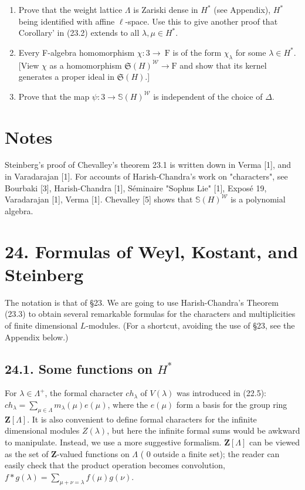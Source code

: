 \documentclass[10pt]{article}
\begin{document}
\begin{enumerate}
  \item Prove that the weight lattice $\Lambda$ is Zariski dense in $H^{*}$ (see Appendix), $H^{*}$ being identified with affine $\ell$-space. Use this to give another proof that Corollary' in (23.2) extends to all $\lambda, \mu \in H^{*}$.
  \item Every F-algebra homomorphism $\chi: 3 \rightarrow \mathrm{~F}$ is of the form $\chi_{\lambda}$ for some $\lambda \in H^{*}$. [View $\chi$ as a homomorphism $\mathfrak{S}(H)^{\mathscr{W}} \rightarrow \mathrm{F}$ and show that its kernel generates a proper ideal in $\mathfrak{S}(H)$.]
  \item Prove that the map $\psi: 3 \rightarrow \mathbb{S}(H)^{\mathscr{W}}$ is independent of the choice of $\Delta$.
\end{enumerate}

\section*{Notes}
Steinberg's proof of Chevalley's theorem 23.1 is written down in Verma [1], and in Varadarajan [1]. For accounts of Harish-Chandra's work on "characters", see Bourbaki [3], Harish-Chandra [1], Séminaire "Sophus Lie" [1], Exposé 19, Varadarajan [1], Verma [1]. Chevalley [5] shows that $\mathbb{S}(H)^{\mathscr{W}}$ is a polynomial algebra.

\section*{24. Formulas of Weyl, Kostant, and Steinberg}
The notation is that of §23. We are going to use Harish-Chandra's Theorem (23.3) to obtain several remarkable formulas for the characters and multiplicities of finite dimensional $L$-modules. (For a shortcut, avoiding the use of §23, see the Appendix below.)

\subsection*{24.1. Some functions on $H^{*}$}
For $\lambda \in \Lambda^{+}$, the formal character $c h_{\lambda}$ of $V(\lambda)$ was introduced in (22.5): $c h_{\lambda}=\sum_{\mu \in \Lambda} m_{\lambda}(\mu) e(\mu)$, where the $e(\mu)$ form a basis for the group ring $\mathbf{Z}[\Lambda]$. It is also convenient to define formal characters for the infinite dimensional modules $Z(\lambda)$, but here the infinite formal sums would be awkward to manipulate. Instead, we use a more suggestive formalism. $\mathbf{Z}[\Lambda]$ can be viewed as the set of $\mathbf{Z}$-valued functions on $\Lambda$ ( 0 outside a finite set); the reader can easily check that the product operation becomes convolution, $f * g(\lambda)=\sum_{\mu+\nu=\lambda} f(\mu) g(\nu)$.
\end{document}
